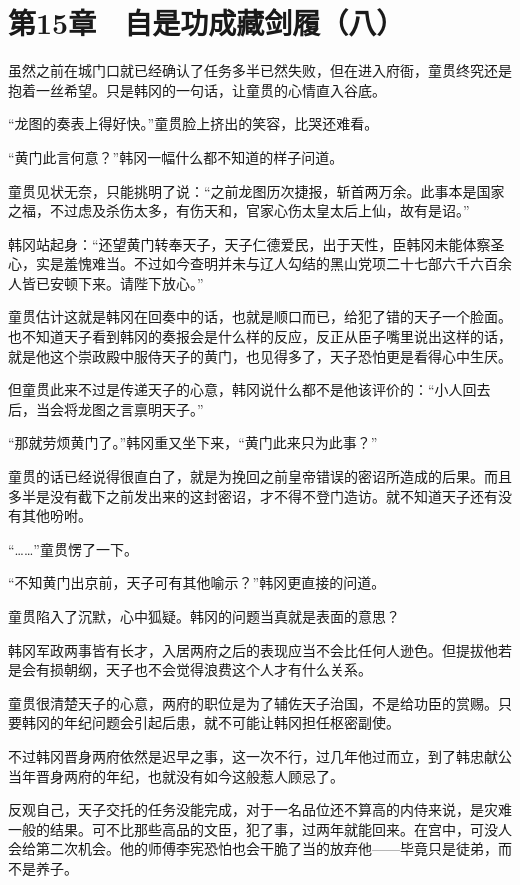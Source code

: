 \section{第15章　自是功成藏剑履（八）}

虽然之前在城门口就已经确认了任务多半已然失败，但在进入府衙，童贯终究还是抱着一丝希望。只是韩冈的一句话，让童贯的心情直入谷底。

“龙图的奏表上得好快。”童贯脸上挤出的笑容，比哭还难看。

“黄门此言何意？”韩冈一幅什么都不知道的样子问道。

童贯见状无奈，只能挑明了说：“之前龙图历次捷报，斩首两万余。此事本是国家之福，不过虑及杀伤太多，有伤天和，官家心伤太皇太后上仙，故有是诏。”

韩冈站起身：“还望黄门转奉天子，天子仁德爱民，出于天性，臣韩冈未能体察圣心，实是羞愧难当。不过如今查明并未与辽人勾结的黑山党项二十七部六千六百余人皆已安顿下来。请陛下放心。”

童贯估计这就是韩冈在回奏中的话，也就是顺口而已，给犯了错的天子一个脸面。也不知道天子看到韩冈的奏报会是什么样的反应，反正从臣子嘴里说出这样的话，就是他这个崇政殿中服侍天子的黄门，也见得多了，天子恐怕更是看得心中生厌。

但童贯此来不过是传递天子的心意，韩冈说什么都不是他该评价的：“小人回去后，当会将龙图之言禀明天子。”

“那就劳烦黄门了。”韩冈重又坐下来，“黄门此来只为此事？”

童贯的话已经说得很直白了，就是为挽回之前皇帝错误的密诏所造成的后果。而且多半是没有截下之前发出来的这封密诏，才不得不登门造访。就不知道天子还有没有其他吩咐。

“……”童贯愣了一下。

“不知黄门出京前，天子可有其他喻示？”韩冈更直接的问道。

童贯陷入了沉默，心中狐疑。韩冈的问题当真就是表面的意思？

韩冈军政两事皆有长才，入居两府之后的表现应当不会比任何人逊色。但提拔他若是会有损朝纲，天子也不会觉得浪费这个人才有什么关系。

童贯很清楚天子的心意，两府的职位是为了辅佐天子治国，不是给功臣的赏赐。只要韩冈的年纪问题会引起后患，就不可能让韩冈担任枢密副使。

不过韩冈晋身两府依然是迟早之事，这一次不行，过几年他过而立，到了韩忠献公当年晋身两府的年纪，也就没有如今这般惹人顾忌了。

反观自己，天子交托的任务没能完成，对于一名品位还不算高的内侍来说，是灾难一般的结果。可不比那些高品的文臣，犯了事，过两年就能回来。在宫中，可没人会给第二次机会。他的师傅李宪恐怕也会干脆了当的放弃他——毕竟只是徒弟，而不是养子。

